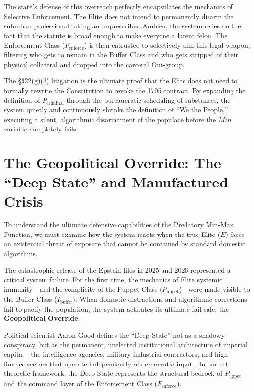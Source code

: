 \documentclass[12pt,openany]{book}
\begin{document}
The state's defense of this overreach perfectly encapsulates the mechanics of Selective Enforcement. The Elite does not intend to permanently disarm the suburban professional taking an unprescribed Ambien; the system relies on the fact that the statute is broad enough to make everyone a latent felon. The Enforcement Class ($F_{\text{enforce}}$) is then entrusted to selectively aim this legal weapon, filtering who gets to remain in the Buffer Class and who gets stripped of their physical collateral and dropped into the carceral Out-group.

The \S922(g)(3) litigation is the ultimate proof that the Elite does not need to formally rewrite the Constitution to revoke the 1705 contract. By expanding the definition of $P_{\text{criminal}}$ through the bureaucratic scheduling of substances, the system quietly and continuously shrinks the definition of ``We the People,'' executing a silent, algorithmic disarmament of the populace before the $Min$ variable completely fails.

\section{The Geopolitical Override: The ``Deep State'' and Manufactured Crisis}

To understand the ultimate defensive capabilities of the Predatory Min-Max Function, we must examine how the system reacts when the true Elite ($E$) faces an existential threat of exposure that cannot be contained by standard domestic algorithms.

The catastrophic release of the Epstein files in 2025 and 2026 represented a critical system failure. For the first time, the mechanics of Elite systemic immunity---and the complicity of the Puppet Class ($P_{\text{uppet}}$)---were made visible to the Buffer Class ($I_{\text{buffer}}$). When domestic distractions and algorithmic corrections fail to pacify the population, the system activates its ultimate fail-safe: the \textbf{Geopolitical Override}.

Political scientist Aaron Good defines the ``Deep State'' not as a shadowy conspiracy, but as the permanent, unelected institutional architecture of imperial capital---the intelligence agencies, military-industrial contractors, and high finance sectors that operate independently of democratic input \cite{good}. In our set-theoretic framework, the Deep State represents the structural bedrock of $P_{\text{uppet}}$ and the command layer of the Enforcement Class ($F_{\text{enforce}}$).
\end{document}
